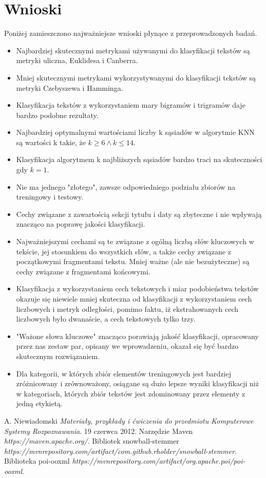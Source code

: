 \documentclass{classrep}
\begin{document}
\section{Wnioski}
Poniżej zamieszczono najważniejsze wnioski płynące z przeprowadzonych badań.
\begin{itemize}[label=$\bullet$\scshape\bfseries]
\item Najbardziej skutecznymi metrykami używanymi do klasyfikacji tekstów są metryki uliczna, Euklidesa i Canberra.
\item Mniej skutecznymi metrykami wykorzystywanymi do klasyfikacji tekstów są metryki Czebyszewa i Hamminga.
\item Klasyfikacja tekstów z wykorzystaniem mary bigramów i trigramów daje bardzo podobne rezultaty.
\item Najbardziej optymalnymi wartościami liczby k sąsiadów w algorytmie KNN są wartości k takie, że $k\geq6 \land k\leq14$.
\item Klasyfikacja algorytmem k najbliższych sąsiadów bardzo traci na skuteczności gdy $k=1$.
\item Nie ma jednego "złotego", zawsze odpowiedniego podziału zbiorów na treningowy i testowy.
\item Cechy związane z zawartością sekcji tytułu i daty są zbyteczne i nie wpływają znacząco na poprawę jakości klasyfikacji.
\item Najważniejszymi cechami są te związane z ogólną liczbą słów kluczowych w tekście, jej stosunkiem do wszystkich słów, a także cechy związane z początkowymi fragmentami tekstu. Mniej ważne (ale nie bezużyteczne) są cechy związane z fragmentami końcowymi.
\item Klasyfikacja z wykorzystaniem cech tekstowych i miar podobieństwa tekstów okazuje się niewiele mniej skuteczna od klasyfikacji z wykorzystaniem cech liczbowych i metryk odległości, pomimo faktu, iż ekstrahowanych cech liczbowych było dwanaście, a cech tekstowych tylko trzy.
\item "Ważone słowa kluczowe" znacząco porawiają jakość klasyfikacji, opracowany przez nas zestaw par, opisany we wprowadzeniu, okazał się być bardzo skutecznym rozwiązaniem.
\item Dla kategorii, w których zbiór elementów treningowych jest bardziej zróżnicowany i zrównoważony, osiągane są dużo lepsze wyniki klasyfikacji niż w kategoriach, których zbiór tekstów jest zdominowany przez elementy z jedną etykietą.
\end{itemize}

\begin{thebibliography}{4}
A. Niewiadomski
\textit{Materiały, przykłady i ćwiczenia do przedmiotu Komputerowe Systemy Rozpoznawania}. 
19 czerwca 2012.
Narzędzie Maven\newline
\textit{https://maven.apache.org/}. 
Bibliotek snowball-stemmer\newline
\textit{https://mvnrepository.com/artifact/com.github.rholder/snowball-stemmer}. 
Biblioteka poi-ooxml\newline
\textit{https://mvnrepository.com/artifact/org.apache.poi/poi-ooxml}. 
\end{thebibliography}
\end{document}

